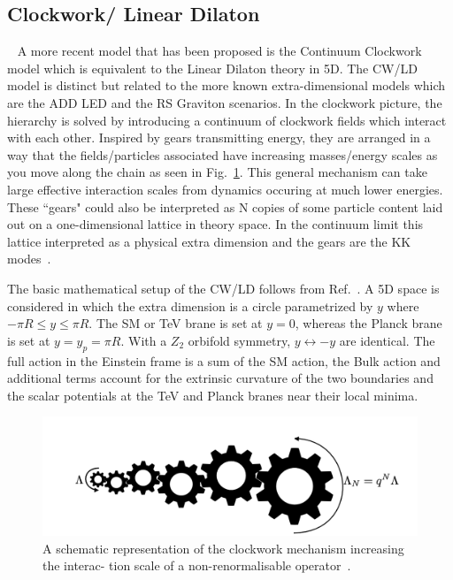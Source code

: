 \subsection{Clockwork/ Linear Dilaton}~\label{sec:CWmodel} 
A more recent model that has been proposed is the Continuum Clockwork model which is equivalent to the Linear Dilaton theory in 5D. The CW/LD model is distinct but related to the more known extra-dimensional models which are the ADD LED and the RS Graviton scenarios. In the clockwork picture, the hierarchy is solved by introducing a continuum of clockwork fields which interact with each other. Inspired by gears transmitting energy, they are arranged in a way that the fields/particles associated have increasing masses/energy scales as you move along the chain as seen in Fig.~\ref{fig:ClockworkSchematic}.
This general mechanism can take large effective interaction scales from dynamics occuring at much lower energies. These ``gears" could also be interpreted as N copies of some particle content laid out on a one-dimensional lattice in theory space. In the continuum limit this lattice interpreted as a physical extra dimension and the gears are the KK modes~\cite{2Clockwork}. 

The basic mathematical setup of the CW/LD follows from Ref.~\cite{Giudice:2017fmj}. A 5D space is considered in which the extra dimension is a circle parametrized by $y$ where $- \pi R \leq y \leq \pi R$. The SM or TeV brane is set at $y = 0 $, whereas the Planck brane is set at $y = y_p = \pi R$. With a $Z_2$ orbifold symmetry, $y\leftrightarrow-y$ are identical. The full action in the Einstein frame is a sum of the SM action, the Bulk action and additional terms account for the extrinsic curvature of the two boundaries and the scalar potentials at the TeV and Planck branes near their local minima.

\begin{figure}
    \centering
    \includegraphics[scale=0.5]{fig/ClockworkSchematic.png}
    \caption{A schematic representation of the clockwork mechanism increasing the interac-
tion scale of a non-renormalisable operator~\cite{2Clockwork}. }
    \label{fig:ClockworkSchematic}
\end{figure}

